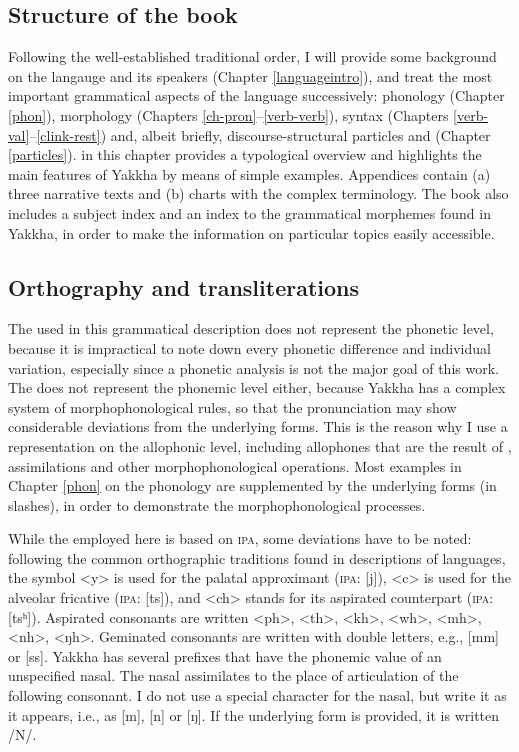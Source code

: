 \subsection{Structure of the book}


Following the well-established traditional order, I will provide some background on the langauge and its speakers (Chapter \ref{languageintro}), and treat the most important grammatical aspects of the language successively: phonology (Chapter \ref{phon}), morphology (Chapters \ref{ch-pron}–\ref{verb-verb}), syntax (Chapters \ref{verb-val}–\ref{clink-rest}) and, albeit briefly, discourse-struc\-tur\-al particles and  (Chapter \ref{particles}).  in this chapter provides a typological overview and highlights the main features of Yakkha by means of simple examples. Appendices contain (a) three narrative texts and  (b) charts with the complex  terminology. The book also includes  a subject index and an index to the grammatical morphemes found in Yakkha, in order to make the information on particular topics easily accessible. 

\subsection{Orthography and transliterations}\label{orth}

The  used in this grammatical description does not represent the phonetic level, because it is impractical to note down every phonetic difference and individual variation, especially since a phonetic analysis is not the major goal of this work. The  does not represent the phonemic level either, because Yakkha has a complex system of morphophonological rules, so that the pronunciation may show considerable deviations from the underlying forms. This is the reason why I use a representation on the allophonic level, including allophones that are the result of , assimilations and other morphophonological operations. Most examples in Chapter \ref{phon} on the phonology  are supplemented by the underlying forms (in slashes), in order to demonstrate the morphophonological processes.

While the   employed here is based on \textsc{ipa}, some deviations have to be noted: following the common orthographic traditions found in descriptions of  languages, the symbol <y> is used for the palatal approximant (\textsc{ipa}: [j]), <c> is used for the alveolar fricative (\textsc{ipa}: [ts]), and <ch> stands for its aspirated counterpart (\textsc{ipa}: [tsʰ]). Aspirated consonants are written <ph>, <th>, <kh>, <wh>, <mh>, <nh>, <ŋh>. Geminated consonants are written with double letters, e.g., [mm] or [ss]. Yakkha has several prefixes that have the phonemic value of an unspecified  nasal. The nasal assimilates to the place of articulation of the following consonant. I do not use a special character for the nasal, but write it as it appears, i.e., as [m], [n] or [ŋ]. If the underlying form is provided, it is written /N/. 

